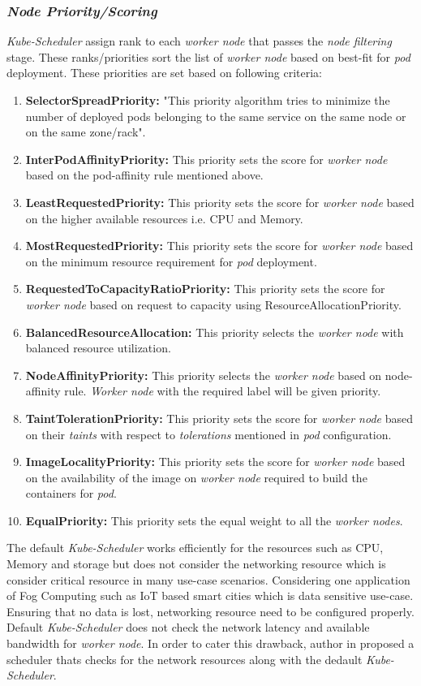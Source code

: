 \subsubsection{\emph{Node Priority/Scoring}}
\label{sec:node-priority}
\emph{Kube-Scheduler} assign rank to each \emph{worker node} that passes the \emph{node filtering} stage. These ranks/priorities sort the list of \emph{worker node} based on best-fit for \emph{pod} deployment. These priorities are set based on following criteria\cite{k8s}:
\begin{enumerate}
  \item \textbf{SelectorSpreadPriority:} "This priority algorithm tries to minimize the number of deployed pods belonging to the same service on the same node or on the same zone/rack"\cite{Santos2019}.
  \item \textbf{InterPodAffinityPriority:} This priority sets the score for \emph{worker node} based on the pod-affinity rule mentioned above.
  \item \textbf{LeastRequestedPriority:} This priority sets the score for \emph{worker node} based on the higher available resources i.e. CPU and Memory.
  \item \textbf{MostRequestedPriority:} This priority sets the score for \emph{worker node} based on the minimum resource requirement for \emph{pod} deployment.
  \item \textbf{RequestedToCapacityRatioPriority:} This priority sets the score for \emph{worker node} based on request to capacity using ResourceAllocationPriority.
  \item \textbf{BalancedResourceAllocation:} This priority selects the \emph{worker node} with balanced resource utilization.
  \item \textbf{NodeAffinityPriority:} This priority selects the \emph{worker node} based on node-affinity rule. \emph{Worker node} with the required label will be given priority.
  \item \textbf{TaintTolerationPriority:} This priority sets the score for \emph{worker node} based on their \emph{taints} with respect to \emph{tolerations} mentioned in \emph{pod} configuration\cite{Santos2019}.
  \item \textbf{ImageLocalityPriority:} This priority sets the score for \emph{worker node} based on the availability of the image on \emph{worker node} required to build the containers for \emph{pod}.
  \item \textbf{EqualPriority:} This priority sets the equal weight to all the \emph{worker nodes}.
\end{enumerate}
The default \emph{Kube-Scheduler} works efficiently for the resources such as CPU, Memory and storage but does not consider the networking resource which is consider critical resource in many use-case scenarios. Considering one application of Fog Computing such as IoT based smart cities which is data sensitive use-case. Ensuring that no data is lost, networking resource need to be configured properly. Default \emph{Kube-Scheduler} does not check the network latency and available bandwidth for \emph{worker node}. In order to cater this drawback, author in \cite{Santos2019} proposed a scheduler thats checks for the network resources along with the dedault \emph{Kube-Scheduler}.
